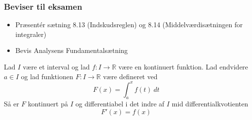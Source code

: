 \subsubsection{Beviser til eksamen}
\begin{itemize}
\setlength\itemsep{0em}
\item Præsentér sætning 8.13 (Indskudsreglen) og 8.14 (Middelværdisætningen for integraler)
\item Bevis Analysens Fundamentalsætning
\end{itemize}
\begin{theorem}
Lad $I$ være et interval og lad $f:I\to\mathbb{R}$ være en kontinuert funktion. Lad endvidere $a\in I$ og lad funktionen $F:I\to\mathbb{R}$ være defineret ved
\begin{equation}
F(x)=\int_a^x \! f(t) \ dt
\end{equation}
Så er $F$ kontinuert på $I$ og differentiabel i det indre af $I$ mid differentialkvotienten
\begin{equation}
F'(x)=f(x)
\end{equation}
\end{theorem}
